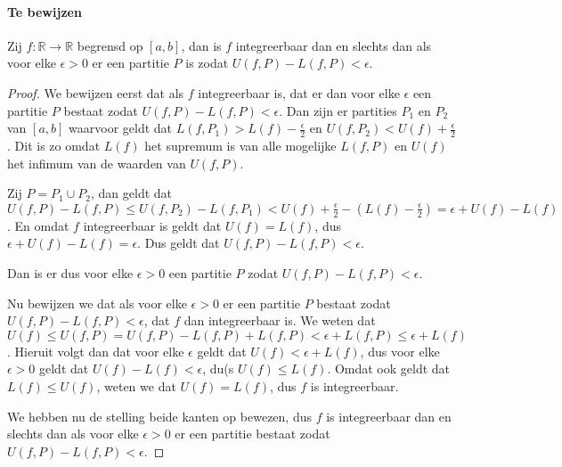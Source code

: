 \label{sec:AF}
\paragraph{Te bewijzen} Zij $f:\mathbb{R}\to\mathbb{R}$ begrensd op $[a,b]$, dan is $f$ integreerbaar dan en slechts dan als voor elke $\epsilon>0$ er een partitie $P$ is zodat $U(f,P)-L(f,P)<\epsilon$.

\begin{proof}
  We bewijzen eerst dat als $f$ integreerbaar is, dat er dan voor elke $\epsilon$ een partitie $P$ bestaat zodat $U(f,P)-L(f,P)<\epsilon$. Dan zijn er partities $P_{1}$ en $P_{2}$ van $[a,b]$ waarvoor geldt dat $L(f,P_{1})>L(f)-\frac{\epsilon}{2}$ en $U(f,P_{2})<U(f)+\frac{\epsilon}{2}$. Dit is zo omdat $L(f)$ het supremum is van alle mogelijke $L(f,P)$ en $U(f)$ het infimum van de waarden van $U(f,P)$. \medskip

  \noindent Zij $P=P_{1}\cup P_{2}$, dan geldt dat $U(f,P)-L(f,P)\leq U(f,P_{2})-L(f,P_{1})<U(f)+\frac{\epsilon}{2}-(L(f)-\frac{\epsilon}{2})=\epsilon+U(f)-L(f)$. En omdat $f$ integreerbaar is geldt dat $U(f)=L(f)$, dus $\epsilon+U(f)-L(f)=\epsilon$. Dus geldt dat $U(f,P)-L(f,P)<\epsilon$. \medskip

  \noindent Dan is er dus voor elke $\epsilon>0$ een partitie $P$ zodat $U(f,P)-L(f,P)<\epsilon$. \medskip

  \noindent Nu bewijzen we dat als voor elke $\epsilon>0$ er een partitie $P$ bestaat zodat $U(f,P)-L(f,P)<\epsilon$, dat $f$ dan integreerbaar is. We weten dat $U(f)\leq U(f,P)=U(f,P) - L(f,P) + L(f,P)<\epsilon+L(f,P)\leq\epsilon + L(f)$. Hieruit volgt dan dat voor elke $\epsilon$ geldt dat $U(f)<\epsilon+L(f)$, dus voor elke $\epsilon>0$ geldt dat $U(f)-L(f)<\epsilon$, du(s $U(f)\leq L(f)$. Omdat ook geldt dat $L(f)\leq U(f)$, weten we dat $U(f)=L(f)$, dus $f$ is integreerbaar. \medskip

  \noindent We hebben nu de stelling beide kanten op bewezen, dus $f$ is integreerbaar dan en slechts dan als voor elke $\epsilon>0$ er een partitie bestaat zodat $U(f,P)-L(f,P)<\epsilon$.
\end{proof}
